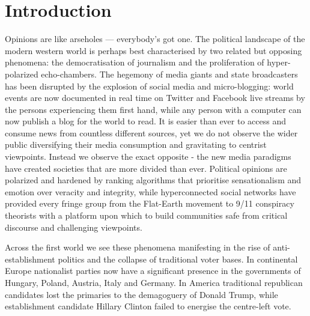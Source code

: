 \documentclass[Dissertation.tex]{subfiles}
\begin{document}
\chapter{Introduction}
Opinions are like arseholes — everybody's got one. The political landscape of the modern western world is perhaps best characterised by two related but opposing phenomena: the democratisation of journalism and the proliferation of hyper-polarized echo-chambers. The hegemony of media giants and state broadcasters has been disrupted by the explosion of social media and micro-blogging:  world events are now documented in real time on Twitter and Facebook live streams by the persons experiencing them first hand, while any person with a computer can now publish a blog for the world to read. It is easier than ever to access and consume news from countless different sources, yet we do not observe the wider public diversifying their media consumption and gravitating to centrist viewpoints. Instead we observe the exact opposite - the new media paradigms have created societies that are more divided than ever. Political opinions are polarized and hardened by ranking algorithms that prioritise sensationalism and emotion over veracity and integrity, while hyperconnected social networks have provided every fringe group from the Flat-Earth movement to 9/11 conspiracy theorists with a platform upon which to build communities safe from critical discourse and challenging viewpoints.

Across the first world we see these phenomena manifesting in the rise of anti-establishment politics and the collapse of traditional voter bases. In continental Europe nationalist parties now have a significant presence in the governments of Hungary, Poland, Austria, Italy and Germany. In America traditional republican candidates lost the primaries to the demagoguery of Donald Trump, while establishment candidate Hillary Clinton failed to energise the centre-left vote. 

\section{}
\end{document}
